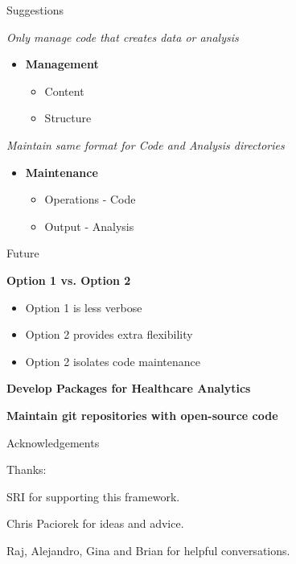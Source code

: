\documentclass{beamer}
\begin{document}
\begin{frame}{Suggestions}

\emph{Only manage code that creates data or analysis}

\begin{itemize}
\item \textbf{Management}
\begin{itemize}
\item Content
\item Structure
\end{itemize}
\end{itemize}
\bigskip

\emph{ Maintain same format for  Code and Analysis directories}
\begin{itemize}
\item \textbf{Maintenance}
\begin{itemize}
\item Operations - Code
\item Output - Analysis
\end{itemize}

\end{itemize}

\end{frame}

\begin{frame}{Future}

\textbf{Option 1 vs. Option 2}
\begin{itemize}
\item Option 1 is less verbose
\item Option 2 provides extra flexibility
\item Option 2 isolates code maintenance
\end{itemize}
\bigskip

\textbf{Develop Packages for Healthcare Analytics}
\bigskip

\textbf{Maintain git repositories with open-source code}

\end{frame}

\begin{frame}{Acknowledgements}

Thanks:

\bigskip

SRI for supporting this framework.\\
\bigskip

Chris Paciorek for ideas and advice.\\
\bigskip

Raj, Alejandro, Gina and Brian for helpful conversations.\\
 
\end{frame}
\end{document}
